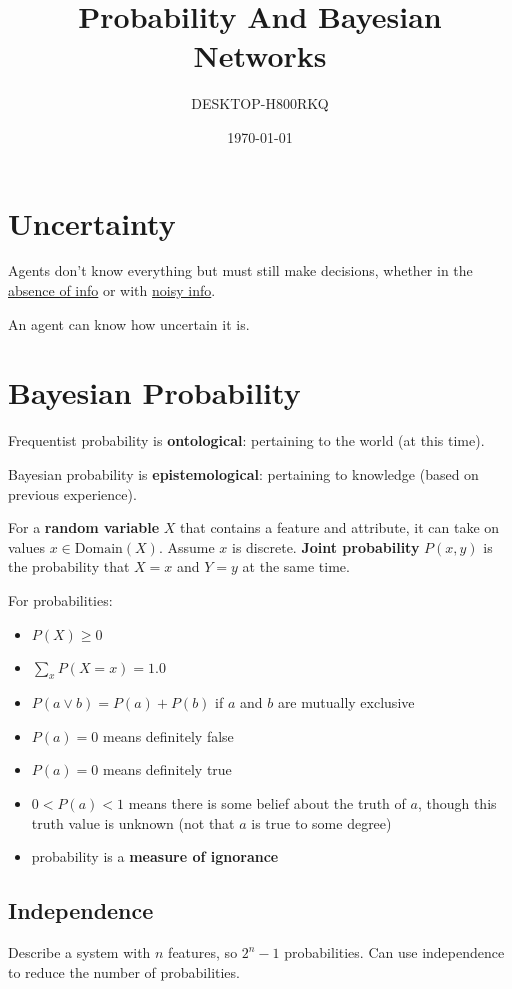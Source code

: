 \documentclass[11pt]{article}
\author{DESKTOP-H800RKQ}
\date{\today}
\title{Probability And Bayesian Networks}
\begin{document}
\maketitle
\tableofcontents

\section{Uncertainty}
\label{sec:orga966710}
Agents don't know everything but must still make decisions,
whether in the \uline{absence of info} or with \uline{noisy info}.

An agent can know how uncertain it is.
\section{Bayesian Probability}
\label{sec:orgfd73723}
Frequentist probability is \textbf{ontological}: pertaining to the world (at this time).

Bayesian probability is \textbf{epistemological}: pertaining to knowledge (based on previous experience).

For a \textbf{random variable} \(X\) that contains a feature and attribute,
it can take on values \(x \in \text{Domain}(X)\).
Assume \(x\) is discrete.
\textbf{Joint probability} \(P(x,y)\) is the probability that \(X = x\) and \(Y = y\) at the same time.

For probabilities:
\begin{itemize}
\item \(P(X) \ge 0\)
\item \(\sum_{x} P(X = x) = 1.0\)
\item \(P(a \vee b) = P(a) + P(b)\) if \(a\) and \(b\) are mutually exclusive
\item \(P(a) = 0\) means definitely false
\item \(P(a) = 0\) means definitely true
\item \(0 < P(a) < 1\) means there is some belief about the truth of \(a\), though this truth value is unknown
(not that \(a\) is true to some degree)
\item probability is a \textbf{measure of ignorance}
\end{itemize}
\subsection{Independence}
\label{sec:org1d5e241}
Describe a system with \(n\) features, so \(2^{n} - 1\) probabilities.
Can use independence to reduce the number of probabilities.
\end{document}
